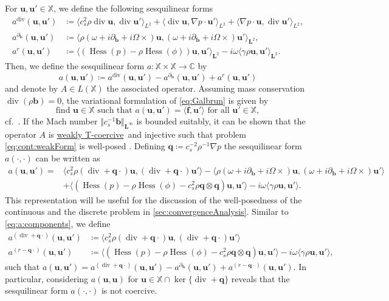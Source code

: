 \documentclass{m2an}
\newcommand{\inner}[1]{\langle #1 \rangle}
\newcommand{\csr}{c_s^2 \rho}
\newcommand{\bflow}{\mathbf{b}}
\newcommand{\angvel}{\Omega}
\newcommand{\conv}{\partial_{\bflow}} %
\newcommand{\opd}{(\omega+i\conv+i\angvel\times)}
\renewcommand{\u}{\mathbf{u}}
\newcommand{\q}{\mathbf{q}} %
\renewcommand{\div}{\operatorname{div}}
\DeclareMathOperator{\hess}{Hess}
\newcommand{\X}{\mathbb{X}}
\newcommand{\bL}{\mathbf{L}}
\newcommand{\bff}{\mathbf{f}}
\newcommand{\spl}{\langle}
\newcommand{\spr}{\rangle}
\newcommand{\diffb}{\partial_{\bflow}}
\newcommand{\adiv}{a^{\div}}
\newcommand{\aconv}{a^{\diffb}}
\newcommand{\arem}{a^{r}}
\newcommand{\adivq}{a^{(\div+\q\cdot)}}
\newcommand{\aremq}{a^{(r-\q\cdot)}}
\newcommand{\weaklyTcoercive}{\hyperlink{weakTcoercivity}{weakly T-coercive}}
\theoremstyle{plain}
\theoremstyle{definition}
\begin{document}
For $\u,\u' \in \X$, we define the following sesquilinear forms
\begin{subequations}\label{eq:a:components}
   \begin{align}
      \adiv(\u,\u') &\coloneqq \inner{\csr \div \u,\div \u'}_{L^2} + \inner{\div \u, \nabla p \cdot \u'}_{L^2} + \inner{\nabla p \cdot \u, \div \u'}_{L^2}, \\
      \aconv(\u,\u') &\coloneqq \inner{\rho \opd \u, \opd \u'}_{\bL^2}, \\
      \arem(\u,\u') &\coloneqq \inner{(\hess(p) - \rho \hess(\phi)) \u, \u'}_{\bL^2} - i \omega \inner{\gamma \rho \u, \u'}_{\bL^2}.
   \end{align}
\end{subequations}
Then, we define the sesquilinear form $a \colon \X \times \X \to \mathbb{C}$ by
\begin{equation}\label{eq:a}
      a(\u,\u') \coloneqq \adiv(\u,\u') - \aconv(\u,\u') + \arem(\u,\u')
\end{equation}
and denote by $A \in L(\X)$ the associated operator. Assuming mass conservation $\div(\rho \bflow) = 0$, the variational formulation of \eqref{eq:Galbrun} is given by
\begin{equation}\label{eq:cont:weakForm}
   \text{find } \u \in \X \text{ such that } a(\u,\u') = \spl \bff, \u' \spr \text{ for all } \u' \in \X, 
\end{equation}
cf.~\cite[Sec. 2.3]{HH21}. If the Mach number $\Vert c_s^{-1} \bflow \Vert_{\bL^\infty}$ is bounded suitably, it can be shown that the operator $A$ is \weaklyTcoercive~and injective such that problem \eqref{eq:cont:weakForm} is well-posed \cite[Thm.~3.11]{HH21}. Defining $\q \coloneqq c_s^{-2} \rho^{-1} \nabla p$ the sesquilinear form $a(\cdot,\cdot)$ can be written as 
\begin{align}
   a(\u,\u')\! = &\spl c_s^2 \rho (\div + \q \cdot) \u, (\div + \q \cdot) \u' \spr \!  - \! \spl \rho (\omega+\! i\conv \!+ \! i\angvel\times) \u, (\omega+ \! i\conv \!+ \! i\angvel\times)  \u' \spr \nonumber \\
   &+ \spl (\hess(p) - \rho \hess(\phi)-c_s^2\rho \q \otimes \q) \u, \u' \spr - i \omega \spl \gamma \rho \u, \u' \spr. \label{eq:aCont:q}
\end{align}
This representation will be useful for the discussion of the well-posedness of the continuous and the discrete problem in \cref{sec:convergenceAnalysis}. Similar to \eqref{eq:a:components}, we define 
\begin{subequations}\label{eq:aq:components}
   \begin{align}
      \adivq (\u,\u') &\coloneqq \inner{c_s^2 \rho (\div + \q \cdot) \u, (\div + \q \cdot) \u'} \\
      \aremq (\u,\u') &\coloneqq \inner{(\hess(p) - \rho \hess(\phi)-c_s^2\rho \q \otimes \q) \u, \u'} - i \omega \inner{\gamma \rho \u, \u'}, 
   \end{align}
\end{subequations}
such that $a(\u,\u') = \adivq(\u,\u') - \aconv(\u,\u') + \aremq(\u,\u')$. In particular, considering $a(\u,\u)$ for $\u \in \X \cap \ker \{ \div + \q \}$ reveals that the sesquilinear form $a(\cdot,\cdot)$ is not coercive.
\end{document}
